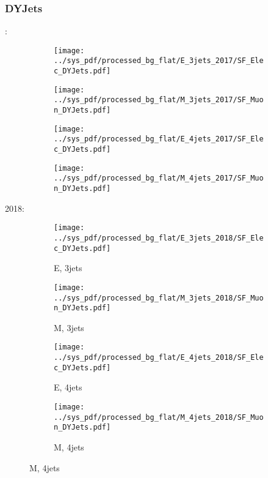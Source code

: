 \documentclass{beamer}
\begin{document}
\begin{frame}
\frametitle{DYJets}
\fontsize{5}{1}:
\begin{figure}
\centering
\begin{subfigure}[b]{0.24\textwidth}
\texttt{[image: ../sys\_pdf/processed\_bg\_flat/E\_3jets\_2017/SF\_Elec\_DYJets.pdf]}
\end{subfigure}
\begin{subfigure}[b]{0.24\textwidth}
\texttt{[image: ../sys\_pdf/processed\_bg\_flat/M\_3jets\_2017/SF\_Muon\_DYJets.pdf]}
\end{subfigure}
\begin{subfigure}[b]{0.24\textwidth}
\texttt{[image: ../sys\_pdf/processed\_bg\_flat/E\_4jets\_2017/SF\_Elec\_DYJets.pdf]}
\end{subfigure}
\begin{subfigure}[b]{0.24\textwidth}
\texttt{[image: ../sys\_pdf/processed\_bg\_flat/M\_4jets\_2017/SF\_Muon\_DYJets.pdf]}
\end{subfigure}
\end{figure}
2018:
\begin{figure}
\centering
\begin{subfigure}[b]{0.24\textwidth}
\texttt{[image: ../sys\_pdf/processed\_bg\_flat/E\_3jets\_2018/SF\_Elec\_DYJets.pdf]}
\captionsetup{font=tiny}
\caption{E, 3jets}
\end{subfigure}
\begin{subfigure}[b]{0.24\textwidth}
\texttt{[image: ../sys\_pdf/processed\_bg\_flat/M\_3jets\_2018/SF\_Muon\_DYJets.pdf]}
\captionsetup{font=tiny}
\caption{M, 3jets}
\end{subfigure}
\begin{subfigure}[b]{0.24\textwidth}
\texttt{[image: ../sys\_pdf/processed\_bg\_flat/E\_4jets\_2018/SF\_Elec\_DYJets.pdf]}
\captionsetup{font=tiny}
\caption{E, 4jets}
\end{subfigure}
\begin{subfigure}[b]{0.24\textwidth}
\texttt{[image: ../sys\_pdf/processed\_bg\_flat/M\_4jets\_2018/SF\_Muon\_DYJets.pdf]}
\captionsetup{font=tiny}
\caption{M, 4jets}
\end{subfigure}
\end{figure}
\end{frame}
\end{document}
